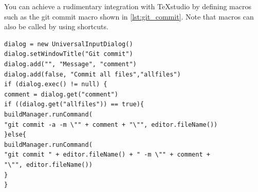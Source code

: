 You can achieve a rudimentary integration with TeXstudio by defining macros such as the git commit macro shown in \autoref{lst:git_commit}. Note that macros can also be called by using shortcuts.

\begin{lstlisting}[caption={\texttt{git commit} macro}, label={lst:git_commit}]
%SCRIPT
dialog = new UniversalInputDialog()
dialog.setWindowTitle("Git commit")
dialog.add("", "Message", "comment")
dialog.add(false, "Commit all files","allfiles")
if (dialog.exec() != null) {
comment = dialog.get("comment")
if ((dialog.get("allfiles")) == true){
buildManager.runCommand(
"git commit -a -m \"" + comment + "\"", editor.fileName())
}else{
buildManager.runCommand(
"git commit " + editor.fileName() + " -m \"" + comment +
"\"", editor.fileName())
}
}
\end{lstlisting}

